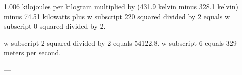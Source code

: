 1.006 kilojoules per kilogram multiplied by (431.9 kelvin minus 328.1 kelvin) minus 74.51 kilowatts plus w subscript 220 squared divided by 2 equals w subscript 0 squared divided by 2.  

w subscript 2 squared divided by 2 equals 54122.8.  
w subscript 6 equals 329 meters per second.  

---